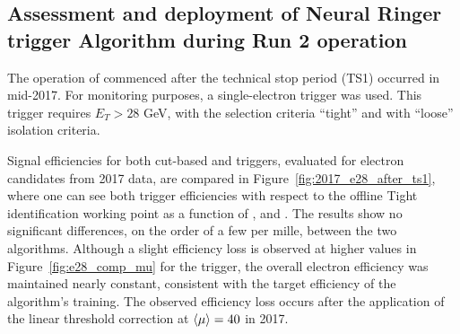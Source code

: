 

\subsection{Assessment and deployment of Neural Ringer trigger Algorithm during Run 2 operation}\label{ssec:deploy_ringer}


The operation of \rnn{} commenced after the technical stop period (TS1) occurred in mid-2017. For monitoring purposes, a single-electron trigger was used. This trigger requires $E_T > 28$ GeV, with the selection criteria \enquote{tight} and with \enquote{loose} isolation criteria.

Signal efficiencies for both cut-based and \rnn{} triggers, evaluated for \tnp{} electron candidates from 2017 data, are compared in Figure~\ref{fig:2017_e28_after_ts1}, where one can see both trigger efficiencies with respect to the offline Tight identification working point as a function of \et{}, \eta{} and \avgmu{}. The results show no significant differences, on the order of a few per mille, between the two algorithms. Although a slight efficiency loss is observed at higher \avgmu{} values in Figure~\ref{fig:e28_comp_mu} for the \rnn{} trigger, the overall electron efficiency was maintained nearly constant, consistent with the target efficiency of the \rnn{} algorithm’s training. The observed efficiency loss occurs after the application of the linear threshold correction at $\langle \mu \rangle=40$ in 2017.





